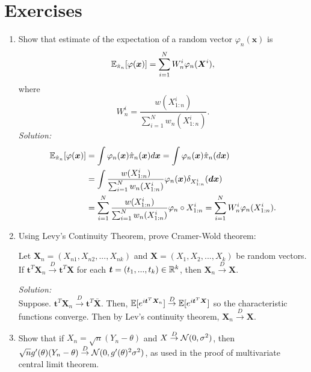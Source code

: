 

\section{Exercises}
\begin{enumerate}
	\item Show that estimate of the expectation of a random vector $\varphi_n(\bm{x})$ is
	\begin{equation}
	\mathbb{E}_{\hat{\pi}_n}[\varphi(\bm{x})] = \sum_{i=1}^{N} W_n^i \varphi_n(\bm{X}^i),
	\end{equation} where
	\begin{equation}\label{eq:weights}
	W_n^i = \dfrac{w(X^i_{1:n})}{\sum_{i=1}^{N} w_n(X^i_{1:n})}.
	\end{equation}
	\textit{Solution:} \\
	\begin{align}
	\mathbb{E}_{\hat{\pi}_n}[\varphi(\bm{x})] &= \int \varphi_n(\bm{x}) \hat{\pi}_n(\bm{x}) d\bm{x} = \int \varphi_n(\bm{x}) \hat{\pi}_n(d\bm{x}) \\
	&= \int \dfrac{w(X^i_{1:n})}{\sum_{i=1}^{N} w_n(X^i_{1:n})} \varphi_n(\bm{x}) \delta_{X^i_{1:n}}(\bm{d\bm{x}})\\
	&= \sum_{i=1}^N \dfrac{w(X^i_{1:n})}{\sum_{i=1}^{N} w_n(X^i_{1:n})} \varphi_n \circ X^i_{1:n} = \sum_{i=1}^N W^i_n \varphi_n(X^i_{1:n}).
	\end{align}
	\item Using Levy's Continuity Theorem, prove Cramer-Wold theorem:
	\begin{theorem}
		Let $\bm{X}_n = (X_{n1}, X_{n2}, ..., X_{nk})$ and $\bm{X} = (X_1, X_2, ..., X_k)$ be random vectors. If $\bm{t}^T \bm{X}_n \overset{D}{\to} \bm{t}^T \bm{X}$ for each $\bm{t} = (t_1, ..., t_k) \in \mathbb{R}^k$, then $\bm{X}_n \overset{D}{\to} \bm{X}$.
	\end{theorem}
	\textit{Solution:} \\
	Suppose. $\bm{t}^T \bm{X}_n \overset{D}{\to} \bm{t}^T \bar{\bm{X}}$. Then, $\mathbb{E}[e^{i\bm{t}^T\bm{X}_n}] \overset{D}{\to} \mathbb{E}[e^{i\bm{t}^T\bm{X}}]$ so the characteristic functions converge. Then by Lev's continuity theorem, $\bm{X}_n \overset{D}{\to} \bm{X}$.
	\item Show that if $X_n = \sqrt{n}(Y_n - \theta)$ and $X \overset{D}{\to} \mathcal{N}(0,\sigma^2)$, then  $\sqrt{n}g'(\theta)(Y_n - \theta) \overset{D}{\to} \mathcal{N}(0,g'(\theta)^2\sigma^2)$, as used in the proof of multivariate central limit theorem.\\

\end{enumerate}
